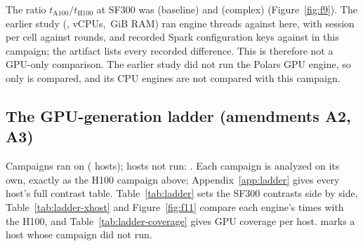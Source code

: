 \documentclass[11pt]{article}
\begin{document}
The \sparkgpu{} ratio $t_{\mathrm{A100}}/t_{\mathrm{H100}}$ at SF300 was
 (baseline) and
 (complex)
(Figure~\ref{fig:f9}). The earlier study (,
 vCPUs, \,GiB
RAM) ran  engine threads against
 here, with
 session per cell against
 rounds, and recorded
 Spark configuration
keys against  in
this campaign; the artifact lists every recorded difference. This is
therefore not a GPU-only comparison. The earlier study did not run the Polars
GPU engine, so only \sparkgpu{} is compared, and its CPU engines are not
compared with this campaign.

\subsection{The GPU-generation ladder (amendments A2, A3)}
\label{sec:ladder}
\ifladderran
Campaigns ran on  ( hosts); hosts not
run: . Each campaign is analyzed on its own, exactly
as the H100 campaign above; Appendix~\ref{app:ladder} gives every host's full
contrast table. Table~\ref{tab:ladder} sets the SF300 contrasts side by side,
Table~\ref{tab:ladder-xhost} and Figure~\ref{fig:f11} compare each engine's
times with the H100, and Table~\ref{tab:ladder-coverage} gives GPU coverage per
host. \hostnotrun{} marks a host whose campaign did not run.
\end{document}
